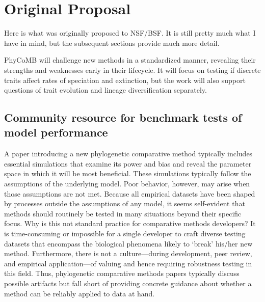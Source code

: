 \section{Original Proposal}

Here is what was originally proposed to NSF/BSF.
It is still pretty much what I have in mind, but the subsequent sections provide much more detail.

\bigskip

PhyCoMB will challenge new methods in a standardized manner, revealing their strengths and weaknesses early in their lifecycle.
It will focus on testing if discrete traits affect rates of speciation and extinction, but the work will also support questions of trait evolution and lineage diversification separately.

\subsection{Community resource for benchmark tests of model performance}

A paper introducing a new phylogenetic comparative method typically includes 
essential simulations that examine its power and bias and reveal the parameter space in which it will be most beneficial.
These simulations typically follow the assumptions of the underlying model.
Poor behavior, however, may arise when those assumptions are not met.
Because all empirical datasets have been shaped by processes outside the assumptions of any model, it seems self-evident that methods should routinely be tested in many situations beyond their specific focus.
Why is this not standard practice for comparative methods developers?
It is time-consuming or impossible for a single developer to craft diverse testing datasets that encompass the biological phenomena likely to `break' his/her new method.
Furthermore, there is not a culture---during development, peer review, and empirical application---of valuing and hence requiring robustness testing in this field.
Thus, phylogenetic comparative methods papers typically discuss possible artifacts but fall short of providing concrete guidance about whether a method can be reliably applied to data at hand. 

